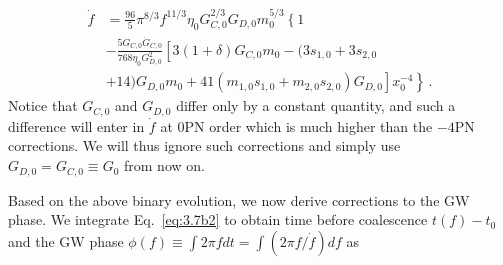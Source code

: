 \documentclass[prd,twocolumn,nofootinbib]{revtex4-1}
\begin{document}
\begin{align}\label{eq:3.7b2}
\dot{f}&=\frac{96}{5} \pi ^{8/3} f^{11/3}\eta_0 G_{C,0}^{2/3}G_{D,0}m_0^{5/3}\left\{1 \right.\nonumber\\& \left.-\frac{5G_{C,0}\dot{G}_{C,0}}{768 \eta_0 G_{D,0}^2}\left[3(1+\delta)G_{C,0}m_0-(3s_{1,0}+3s_{2,0}\right.\right.\nonumber\\ &\left.\left.+14)G_{D,0}m_0+41(m_{1,0}s_{1,0}+m_{2,0}s_{2,0})G_{D,0}\right]x_0^{-4}\right\}\,.
\end{align}
Notice that $G_{C,0}$ and $G_{D,0}$ differ only by a constant quantity, and such a difference will enter in $\dot f$ at 0PN order which is much higher than the $-4$PN corrections. We will thus ignore such corrections and simply use $G_{D,0}= G_{C,0}\equiv G_0$ from now on. 

Based on the above binary evolution, we now derive corrections to the GW phase.
We integrate Eq.~\eqref{eq:3.7b2} to obtain time before coalescence $t(f)-t_0$ and the GW phase $\phi(f)\equiv \int 2 \pi f dt = \int (2\pi f/\dot{f})df$ as
\end{document}
